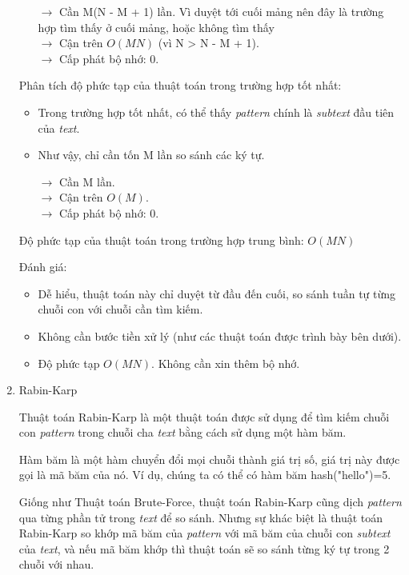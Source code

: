 \documentclass[a4paper,11pt]{article}
\begin{document}
\begin{enumerate}
\begin{itemize}
				$\to$ Cần M(N - M + 1) lần. Vì duyệt tới cuối mảng nên đây là trường hợp tìm thấy ở cuối mảng, hoặc không tìm thấy\\
				$\to$ Cận trên $O(MN)$ (vì N > N - M + 1). \\
				$\to$ Cấp phát bộ nhớ: 0.
			\end{itemize}

			Phân tích độ phức tạp của thuật toán trong trường hợp tốt nhất:
			\begin{itemize}
				\item Trong trường hợp tốt nhất, có thể thấy \textit{pattern} chính là \textit{subtext} đầu tiên của \textit{text}.
				\item Như vậy, chỉ cần tốn M lần so sánh các ký tự.
				
				$\to$ Cần M lần. \\
				$\to$ Cận trên $O(M)$. \\
				$\to$ Cấp phát bộ nhớ: 0.
			\end{itemize}

			Độ phức tạp của thuật toán trong trường hợp trung bình: $O(MN)$
			
			Đánh giá:
			\begin{itemize}
				\item Dễ hiểu, thuật toán này chỉ duyệt từ đầu đến cuối, so sánh tuần tự từng chuỗi con với chuỗi cần tìm kiếm.
				\item Không cần bước tiền xử lý (như các thuật toán được trình bày bên dưới).
				\item Độ phức tạp $O(MN)$. Không cần xin thêm bộ nhớ.
			\end{itemize}

		\item Rabin-Karp
		
			Thuật toán Rabin-Karp là một thuật toán được sử dụng để tìm kiếm
			chuỗi con \textit{pattern} trong chuỗi cha \textit{text} bằng cách sử dụng một hàm băm.

			Hàm băm là một hàm chuyển đổi mọi chuỗi thành giá trị số, giá trị này được gọi là mã băm của nó. Ví dụ, chúng ta có thể có hàm băm hash("hello")=5.

			Giống như Thuật toán Brute-Force, thuật toán Rabin-Karp cũng dịch \textit{pattern} 
			qua từng phần tử trong \textit{text} để so sánh.
			Nhưng sự khác biệt là thuật toán Rabin-Karp so khớp mã băm của \textit{pattern} 
			với mã băm của chuỗi con \textit{subtext} của \textit{text}, và nếu mã băm khớp thì thuật toán sẽ so sánh từng ký tự trong 2 chuỗi với nhau.


\end{enumerate}
\end{document}
